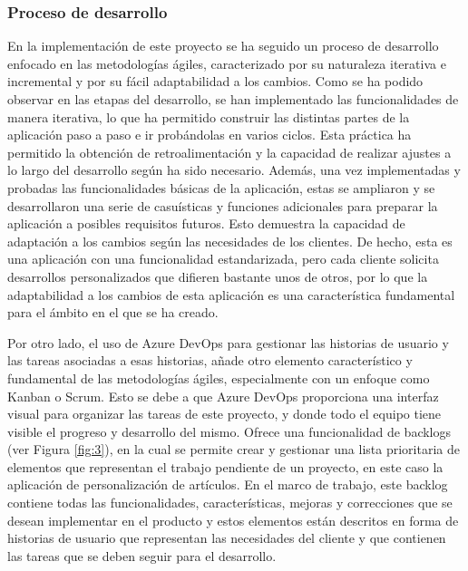 \documentclass[11pt]{article}
\begin{document}
\subsubsection{Proceso de desarrollo}
En la implementación de este proyecto se ha seguido un proceso de desarrollo enfocado en las metodologías ágiles, caracterizado por su naturaleza iterativa e incremental y por su fácil adaptabilidad a los cambios. Como se ha podido observar en las etapas del desarrollo,
se han implementado las funcionalidades de manera iterativa, lo que ha permitido construir las distintas partes de la aplicación paso a paso e ir probándolas en varios ciclos.
Esta práctica ha permitido la obtención de retroalimentación y la capacidad de realizar ajustes a lo largo del desarrollo según ha sido necesario.
Además, una vez implementadas y probadas las funcionalidades básicas de la aplicación, estas se ampliaron y se desarrollaron una serie de casuísticas y funciones adicionales para preparar la aplicación a posibles
requisitos futuros. Esto demuestra la capacidad de adaptación a los cambios según las necesidades de los clientes. De hecho, esta es una aplicación con una funcionalidad estandarizada, pero 
cada cliente solicita desarrollos personalizados que difieren bastante unos de otros, por lo que la adaptabilidad a los cambios de esta aplicación es una característica fundamental para el ámbito en el que se ha creado.

Por otro lado, el uso de Azure DevOps para gestionar las historias de usuario y las tareas asociadas a esas historias, añade otro elemento característico y fundamental de las metodologías ágiles, especialmente con un enfoque como Kanban o Scrum.
Esto se debe a que Azure DevOps proporciona una interfaz visual para organizar las tareas de este proyecto, y donde todo el equipo tiene visible el progreso y desarrollo del mismo.
Ofrece una funcionalidad de backlogs (ver Figura \ref{fig:3}), en la cual se permite crear y gestionar una lista prioritaria de elementos que representan el trabajo pendiente de un proyecto, en este caso la aplicación de personalización de artículos. 
En el marco de trabajo, este backlog contiene todas las funcionalidades, características, mejoras y correcciones que se desean implementar
en el producto y estos elementos están descritos en forma de historias de usuario que representan las necesidades del cliente y que contienen las 
tareas que se deben seguir para el desarrollo.
\end{document}
